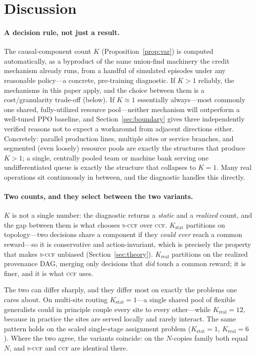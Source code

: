 \documentclass[review,authoryear,3p,times]{elsarticle}
\newcommand{\ccf}{\textsc{ccf}}
\newcommand{\sccf}{\textsc{s-ccf}}
\newcommand{\Kstat}{K_{\mathrm{stat}}}
\newcommand{\Krea}{K_{\mathrm{real}}}
\begin{document}
\section{Discussion}
\label{sec:discussion}

\paragraph{A decision rule, not just a result.} The causal-component
count $K$ (Proposition~\ref{prop:var}) is computed automatically, as a
byproduct of the same union-find machinery the credit mechanism already
runs, from a handful of simulated episodes under any reasonable policy---a
concrete, pre-training diagnostic. If $K>1$ reliably, the mechanisms in this
paper apply, and the choice between them is a cost/granularity
trade-off (below). If $K\approx1$ essentially always---most commonly one
shared, fully-utilized resource pool---neither mechanism will outperform a
well-tuned PPO baseline, and Section~\ref{sec:boundary} gives three
independently verified reasons not to expect a workaround from adjacent
directions either. Concretely: parallel production lines, multiple sites or
service branches, and segmented (even loosely) resource pools are exactly
the structures that produce $K>1$; a single, centrally pooled team or
machine bank serving one undifferentiated queue is exactly the structure
that collapses to $K=1$. Many real operations sit continuously in between,
and the diagnostic handles this directly.

\paragraph{Two counts, and they select between the two variants.} $K$ is not a
single number: the diagnostic returns a \emph{static} and a \emph{realized}
count, and the gap between them is what chooses \sccf{} over \ccf{}.
$\Kstat$ partitions on topology---two decisions share a component if they
\emph{could ever} reach a common reward---so it is conservative and
action-invariant, which is precisely the property that makes \sccf{}
unbiased (Section~\ref{sec:theory}). $\Krea$ partitions on the realized
provenance DAG, merging only decisions that \emph{did} touch a common reward;
it is finer, and it is what \ccf{} uses.

The two can differ sharply, and they differ most on exactly the problems one
cares about. On multi-site routing $\Kstat=1$---a single shared pool of
flexible generalists could in principle couple every site to every other---while
$\Krea=12$, because in practice the sites are served locally and rarely
interact. The same pattern holds on the scaled single-stage assignment problem
($\Kstat=1$, $\Krea=6$). Where the two agree, the variants coincide: on the
$N$-copies family both equal $N$, and \sccf{} and \ccf{} are identical there.
\end{document}
